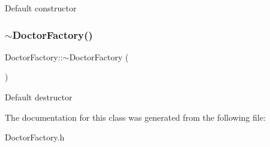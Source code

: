 Default constructor \mbox{\label{classDoctorFactory_a3f2ed2a1a4378d3490c0412645f70767}} 
\subsubsection{\texorpdfstring{$\sim$\+Doctor\+Factory()}{~DoctorFactory()}}
{\footnotesize\ttfamily Doctor\+Factory\+::$\sim$\+Doctor\+Factory (\begin{DoxyParamCaption}{ }\end{DoxyParamCaption})}

Default destructor 

The documentation for this class was generated from the following file\+:\begin{DoxyCompactItemize}
\item 
Doctor\+Factory.\+h\end{DoxyCompactItemize}
